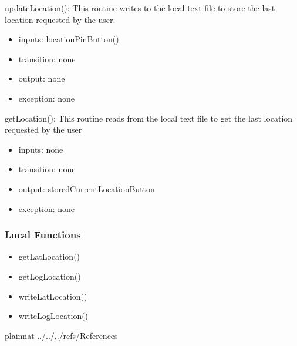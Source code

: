 \documentclass[12pt, titlepage]{article}
\begin{document}
\noindent updateLocation():
This routine writes to the local text file to store the last location requested by the user.
\begin{itemize}
\item inputs: locationPinButton()
\item transition: none
\item output: none
\item exception: none
\end{itemize}

\noindent getLocation():
This routine reads from the local text file to get the last location requested by the user
\begin{itemize}
\item inputs: none
\item transition: none
\item output: storedCurrentLocationButton
\item exception: none
\end{itemize}

\subsubsection{Local Functions}

\begin{itemize}
\item getLatLocation()
\item getLogLocation()
\item writeLatLocation()
\item writeLogLocation()
\end{itemize}

\newpage

 {plainnat}
 {../../../refs/References}



\end{document}
